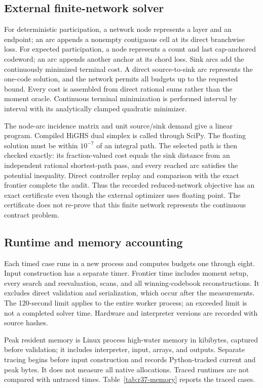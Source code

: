 \subsection{External finite-network solver}
For deterministic participation, a network node represents a layer and an endpoint; an arc appends a nonempty contiguous cell at its direct branchwise loss. For expected participation, a node represents a count and last cap-anchored codeword; an arc appends another anchor at its chord loss. Sink arcs add the continuously minimized terminal cost. A direct source-to-sink arc represents the one-code solution, and the network permits all budgets up to the requested bound. Every cost is assembled from direct rational sums rather than the moment oracle. Continuous terminal minimization is performed interval by interval with its analytically clamped quadratic minimizer.

The node-arc incidence matrix and unit source/sink demand give a linear program. Compiled HiGHS dual simplex is called through SciPy. The floating solution must be within $10^{-7}$ of an integral path. The selected path is then checked exactly: its fraction-valued cost equals the sink distance from an independent rational shortest-path pass, and every reached arc satisfies the potential inequality. Direct controller replay and comparison with the exact frontier complete the audit. Thus the recorded reduced-network objective has an exact certificate even though the external optimizer uses floating point. The certificate does not re-prove that this finite network represents the continuous contract problem.

\subsection{Runtime and memory accounting}
Each timed case runs in a new process and computes budgets one through eight. Input construction has a separate timer. Frontier time includes moment setup, every search and reevaluation, scans, and all winning-codebook reconstructions. It excludes direct validation and serialization, which occur after the measurements. The 120-second limit applies to the entire worker process; an exceeded limit is not a completed solver time. Hardware and interpreter versions are recorded with source hashes.

Peak resident memory is Linux process high-water memory in kibibytes, captured before validation; it includes interpreter, input, arrays, and outputs. Separate tracing begins before input construction and records Python-tracked current and peak bytes. It does not measure all native allocations. Traced runtimes are not compared with untraced times. Table~\ref{tab:r37-memory} reports the traced cases.

